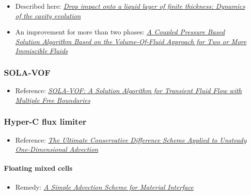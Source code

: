 \begin{itemize}
    \item Described here: \textit{\href{http://link.libris.kb.se/sfxliub?sid=?url_ver=Z39.88-2004&rfr_id=info:sid/bibl.liu.se\%3Axerxes+\%28+PubMed+LiU\%29&rft.genre=article&rft_val_fmt=info\%3Aofi\%2Ffmt\%3Akev\%3Amtx\%3Ajournal&rft.issn=15393755&rft.date=2009&rft.jtitle=Phys+Rev+E+Stat+Nonlin+Soft+Matter+Phys&rft.volume=79&rft.issue=3+Pt+2&rft.spage=036306&rft.atitle=Drop+impact+onto+a+liquid+layer+of+finite+thickness+\%3A+dynamics+of+the+cavity+evolution+&rft.aulast=Berberovi\%C4\%87&rft.aufirst=Edin}{Drop impact onto a liquid layer of finite thickness: Dynamics of the cavity evolution}}
    \item An improvement for more than two phases: \textit{\href{http://www.mathematik.uni-ulm.de/numerik/staff/urban/reports/ECCOMASCFD2010paperfinal.pdf}{A Coupled Pressure Based Solution Algorithm Based on the Volume-Of-Fluid Approach for Two or More Immiscible Fluids}}
\end{itemize}

\subsubsection{SOLA-VOF}

\begin{itemize}
    \item Reference: \textit{\href{http://www.ewp.rpi.edu/hartford/~ernesto/Su2012/CFD/Readings/SOLA-VOF-1980-P1.pdf}{SOLA-VOF: A Solution Algorithm for Transient Fluid Flow with Multiple Free Boundaries}}
\end{itemize}

\subsubsection{Hyper-C flux limiter}

\begin{itemize}
    \item Reference: \textit{\href{http://www.water.tkk.fi/wr/kurssit/Yhd-12.112/TVD1.pdf}{The Ultimate Conservative Difference Scheme Applied to Unsteady One-Dimensional Advection}}
\end{itemize}

\paragraph{Floating mixed cells}

\begin{itemize}
    \item Remedy: \textit{\href{https://e-reports-ext.llnl.gov/pdf/245038.pdf}{A Simple Advection Scheme for Material Interface}}
\end{itemize}

